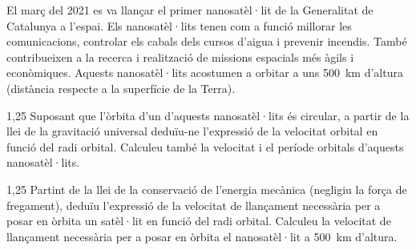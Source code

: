 El març del 2021 es va llançar el primer nanosatèl·lit de la Generalitat de Catalunya a l'espai. Els nanosatèl·lits tenen com a funció millorar les comunicacions, controlar els cabals dels cursos d'aigua i prevenir incendis. També contribueixen a la recerca i realització de missions espacials més àgils i econòmiques. Aquests nanosatèl·lits acostumen a orbitar a uns 500~km d'altura (distància respecte a la superfície de la Terra).

\begin{apartat}{1,25}
Suposant que l'òrbita d'un d'aquests nanosatèl·lits és circular, a partir de la llei de la gravitació universal deduïu-ne l'expressió de la velocitat orbital en funció del radi orbital. Calculeu també la velocitat i el període orbitals d'aquests nanosatèl·lits.
\end{apartat}

\begin{apartat}{1,25}
Partint de la llei de la conservació de l'energia mecànica (negligiu la força de fregament), deduïu l'expressió de la velocitat de llançament necessària per a posar en òrbita un satèl·lit en funció del radi orbital. Calculeu la velocitat de llançament necessària per a posar en òrbita el nanosatèl·lit a 500~km d'altura.
\end{apartat}

